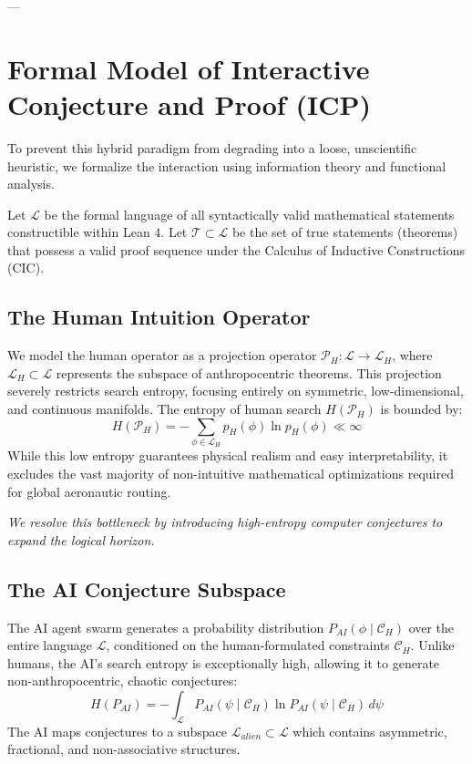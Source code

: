 \documentclass[11pt,a4paper]{book}
\begin{document}
---

\section{Formal Model of Interactive Conjecture and Proof (ICP)}
\label{sec:icp_model}

To prevent this hybrid paradigm from degrading into a loose, unscientific heuristic, we formalize the interaction using information theory and functional analysis. 

Let $\mathcal{L}$ be the formal language of all syntactically valid mathematical statements constructible within Lean 4. Let $\mathcal{T} \subset \mathcal{L}$ be the set of true statements (theorems) that possess a valid proof sequence under the Calculus of Inductive Constructions (CIC).

\subsection{The Human Intuition Operator}
We model the human operator as a projection operator $\mathcal{P}_H: \mathcal{L} \to \mathcal{L}_H$, where $\mathcal{L}_H \subset \mathcal{L}$ represents the subspace of anthropocentric theorems. This projection severely restricts search entropy, focusing entirely on symmetric, low-dimensional, and continuous manifolds. The entropy of human search $H(\mathcal{P}_H)$ is bounded by:
\begin{equation}
    H(\mathcal{P}_H) = - \sum_{\phi \in \mathcal{L}_H} p_H(\phi) \ln p_H(\phi) \ll \infty
\end{equation}
While this low entropy guarantees physical realism and easy interpretability, it excludes the vast majority of non-intuitive mathematical optimizations required for global aeronautic routing.

\textit{We resolve this bottleneck by introducing high-entropy computer conjectures to expand the logical horizon.}

\subsection{The AI Conjecture Subspace}
The AI agent swarm generates a probability distribution $P_{AI}(\phi \mid \mathcal{C}_H) $ over the entire language $\mathcal{L}$, conditioned on the human-formulated constraints $\mathcal{C}_H$. Unlike humans, the AI's search entropy is exceptionally high, allowing it to generate non-anthropocentric, chaotic conjectures:
\begin{equation}
    H(P_{AI}) = - \int_{\mathcal{L}} P_{AI}(\psi \mid \mathcal{C}_H) \ln P_{AI}(\psi \mid \mathcal{C}_H) \, d\psi
\end{equation}
The AI maps conjectures to a subspace $\mathcal{L}_{alien} \subset \mathcal{L}$ which contains asymmetric, fractional, and non-associative structures.
\end{document}
